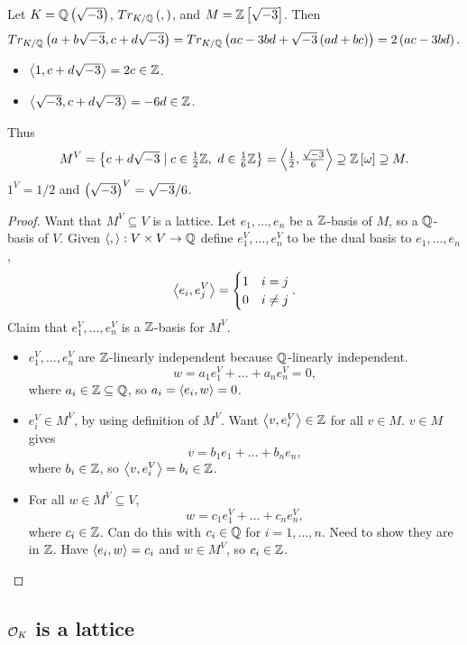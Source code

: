 \begin{example*}
Let $ K = \mathbb{Q}\left( \sqrt{-3} \right) $, $ Tr_{K / \mathbb{Q}}\left( , \right) $, and $ M = \mathbb{Z}\left[ \sqrt{-3} \right] $. Then
$$ Tr_{K / \mathbb{Q}}\left( a + b\sqrt{-3}, c + d\sqrt{-3} \right) = Tr_{K / \mathbb{Q}}\left( ac - 3bd + \sqrt{-3}\left( ad + bc \right) \right) = 2\left( ac - 3bd \right). $$
\begin{itemize}
\item $ \left\langle 1, c + d\sqrt{-3} \right\rangle = 2c \in \mathbb{Z} $.
\item $ \left\langle \sqrt{-3}, c + d\sqrt{-3} \right\rangle = -6d \in \mathbb{Z} $.
\end{itemize}
Thus
$$ M^V = \left\{ c + d\sqrt{-3} \mid c \in \tfrac{1}{2}\mathbb{Z}, \ d \in \tfrac{1}{6}\mathbb{Z} \right\} = \left\langle \tfrac{1}{2}, \tfrac{\sqrt{-3}}{6} \right\rangle \supseteq \mathbb{Z}\left[ \omega \right] \supseteq M. $$
$ 1^V = 1 / 2 $ and $ \left( \sqrt{-3} \right)^V = \sqrt{-3} / 6 $.
\end{example*}

\begin{proof}
Want that $ M^V \subseteq V $ is a lattice. Let $ e_1, \dots, e_n $ be a $ \mathbb{Z} $-basis of $ M $, so a $ \mathbb{Q} $-basis of $ V $. Given $ \left\langle , \right\rangle : V \times V \to \mathbb{Q} $ define $ e_1^V, \dots, e_n^V $ to be the dual basis to $ e_1, \dots, e_n $,
$$ \left\langle e_i, e_j^V \right\rangle =
\begin{cases}
1 & i = j \\
0 & i \ne j
\end{cases}.
$$
Claim that $ e_1^V, \dots, e_n^V $ is a $ \mathbb{Z} $-basis for $ M^V $.
\begin{itemize}
\item $ e_1^V, \dots, e_n^V $ are $ \mathbb{Z} $-linearly independent because $ \mathbb{Q} $-linearly independent.
$$ w = a_1e_1^V + \dots + a_ne_n^V = 0, $$
where $ a_i \in \mathbb{Z} \subseteq \mathbb{Q} $, so $ a_i = \left\langle e_i, w \right\rangle = 0 $.
\item $ e_i^V \in M^V $, by using definition of $ M^V $. Want $ \left\langle v, e_i^V \right\rangle \in \mathbb{Z} $ for all $ v \in M $. $ v \in M $ gives
$$ v = b_1e_1 + \dots + b_ne_n, $$
where $ b_i \in \mathbb{Z} $, so $ \left\langle v, e_i^V \right\rangle = b_i \in \mathbb{Z} $.
\item For all $ w \in M^V \subseteq V $,
$$ w = c_1e_1^V + \dots + c_ne_n^V, $$
where $ c_i \in \mathbb{Z} $. Can do this with $ c_i \in \mathbb{Q} $ for $ i = 1, \dots, n $. Need to show they are in $ \mathbb{Z} $. Have $ \left\langle e_i, w \right\rangle = c_i $ and $ w \in M^V $, so $ c_i \in \mathbb{Z} $.
\end{itemize}
\end{proof}

\pagebreak

\subsection{$ \mathcal{O}_K $ is a lattice}

